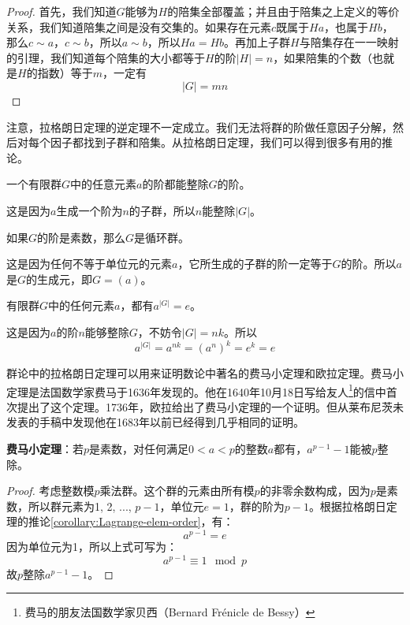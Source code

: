 \documentclass{article}
\begin{document}
\begin{proof}
首先，我们知道$G$能够为$H$的陪集全部覆盖；并且由于陪集之上定义的等价关系，我们知道陪集之间是没有交集的。如果存在元素$c$既属于$Ha$，也属于$Hb$，那么$c \sim a$，$c \sim b$，所以$a \sim b$，所以$Ha = Hb$。再加上子群$H$与陪集存在一一映射的引理，我们知道每个陪集的大小都等于$H$的阶$|H|=n$，如果陪集的个数（也就是$H$的指数）等于$m$，一定有
\[
|G| = mn
\]
\end{proof}

注意，拉格朗日定理的逆定理不一定成立。我们无法将群的阶做任意因子分解，然后对每个因子都找到子群和陪集。从拉格朗日定理，我们可以得到很多有用的推论。

\begin{corollary}
一个有限群$G$中的任意元素$a$的阶都能整除$G$的阶。
\end{corollary}

这是因为$a$生成一个阶为$n$的子群，所以$n$能整除$|G|$。

\begin{corollary}
如果$G$的阶是素数，那么$G$是循环群。
\end{corollary}

这是因为任何不等于单位元的元素$a$，它所生成的子群的阶一定等于$G$的阶。所以$a$是$G$的生成元，即$G = (a)$。

\begin{corollary}
有限群$G$中的任何元素$a$，都有$a^{|G|} = e$。
\label{corollary:Lagrange-elem-order}
\end{corollary}

这是因为$a$的阶$n$能够整除$G$，不妨令$|G| = nk$。所以
\[
a^{|G|} = a^{nk} = (a^n)^k = e^k = e
\]

群论中的拉格朗日定理可以用来证明数论中著名的费马小定理和欧拉定理。费马小定理是法国数学家费马于1636年发现的。他在1640年10月18日写给友人\footnote{费马的朋友法国数学家贝西（Bernard Frénicle de Bessy）}的信中首次提出了这个定理。1736年，欧拉给出了费马小定理的一个证明。但从莱布尼茨未发表的手稿中发现他在1683年以前已经得到几乎相同的证明。

\begin{theorem}
\textbf{费马小定理}：若$p$是素数，对任何满足$0 < a < p$的整数$a$都有，$a^{p-1}-1$能被$p$整除。
\end{theorem}

\begin{proof}
考虑整数模$p$乘法群。这个群的元素由所有模$p$的非零余数构成，因为$p$是素数，所以群元素为1, 2, ..., $p-1$，单位元$e = 1$，群的阶为$p-1$。根据拉格朗日定理的推论\ref{corollary:Lagrange-elem-order}，有：
\[
a^{p-1} = e
\]
因为单位元为1，所以上式可写为：
\[
a^{p-1} \equiv 1 \mod p
\]
故$p$整除$a^{p-1} - 1$。
\end{proof}
\end{document}
